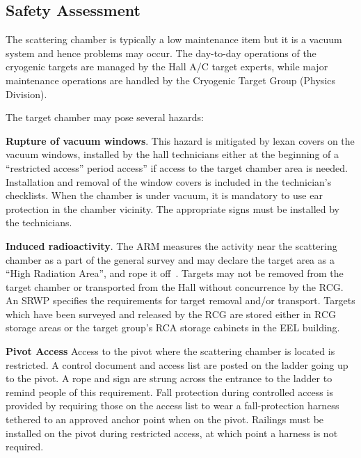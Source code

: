 {%
\subsection{Safety Assessment}

The scattering chamber is typically a low maintenance item but it is a
vacuum system and hence problems may occur. The day-to-day operations
of the cryogenic targets are managed by the Hall A/C target experts,
while major maintenance operations are handled by the Cryogenic Target
Group (Physics Division).

The target chamber may pose several hazards:

\begin{list}{.~}{\setlength{\itemsep}{-0.15cm}}
  \item {\bf Rupture of vacuum windows}. This hazard is mitigated by
    lexan covers on the vacuum windows, installed by the hall
    technicians either at the beginning of a ``restricted access''
    period
    access'' if access to the target chamber area is needed.
    Installation and removal of the window covers is included in the
    technician's checklists.  When the chamber is under vacuum, it is
    mandatory to use ear protection in the chamber vicinity. The
    appropriate signs must be installed by the technicians.

  \item {\bf Induced radioactivity}. The ARM measures the activity
    near the scattering chamber as a part of the general survey and
    may declare the target area as a ``High Radiation Area'', and rope
    it off~\cite{RWIcebaf}.  Targets may not be removed from the
    target chamber or transported from the Hall without concurrence by
    the RCG. An SRWP specifies the requirements for target removal
    and/or transport. Targets which have been surveyed and released by
    the RCG are stored either in RCG storage areas or the target
    group's RCA storage cabinets in the EEL building.
        
\item {\bf Pivot Access} Access to the pivot where the scattering
  chamber is located is restricted. A control document and access list
  are posted on the ladder going up to the pivot. A rope and sign are
  strung across the entrance to the ladder to remind people of this
  requirement. Fall protection during controlled access is provided by
  requiring those on the access list to wear a fall-protection harness
  tethered to an approved anchor point when on the pivot. Railings
  must be installed on the pivot during restricted access, at which
  point a harness is not required.


\end{list}}
